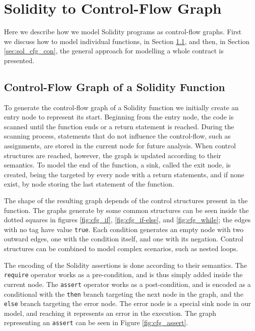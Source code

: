 \section{Solidity to Control-Flow Graph}

Here we describe how we model Solidity programs as control-flow graphs. First we discuss how to model individual functions, in Section \ref{sec:sol_cfg_fun}, and then, in Section \ref{sec:sol_cfg_con}, the general approach for modelling a whole contract is presented.


\subsection{Control-Flow Graph of a Solidity Function} \label{sec:sol_cfg_fun}

To generate the control-flow graph of a Solidity function we initially create an entry node to represent its start. Beginning from the entry node, the code is scanned until the function ends or a return statement is reached. During the scanning process, statements that do not influence the control-flow, such as assignments, are stored in the current node for future analysis. When control structures are reached, however, the graph is updated according to their semantics. To model the end of the function, a sink, called the exit node, is created, being the targeted by every node with a return statements, and if none exist, by node storing the last statement of the function.

The shape of the resulting graph depends of the control structures present in the function. The graphs generate by some common structures can be seen inside the dotted squares in figures \ref{fig:cfg_if}, \ref{fig:cfg_if-else}, and \ref{fig:cfg_while}; the edges with no tag have value \texttt{true}. Each condition generates an empty node with two outward edges, one with the condition itself, and one with its negation. Control structures can be combined to model complex scenarios, such as nested loops.

The encoding of the Solidity assertions is done according to their semantics. The \texttt{require} operator works as a pre-condition, and is thus simply added inside the current node. The \texttt{assert} operator works as a post-condition, and is encoded as a conditional with the \texttt{then} branch targeting the next node in the graph, and the \texttt{else} branch targeting the error node. The error node is a special sink node in our model, and reaching it represents an error in the execution. The graph representing an \texttt{assert} can be seen in Figure \ref{fig:cfg_assert}.

